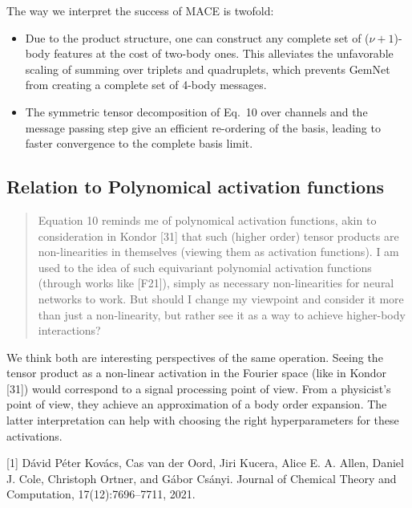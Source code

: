 \documentclass{article}
\begin{document}
The way we interpret the success of MACE is twofold:
\begin{itemize}
\item Due to the product structure, one can construct any complete set of ($\nu + 1$)-body features at the cost of two-body ones.
This alleviates the unfavorable scaling of summing over triplets and quadruplets, which prevents GemNet from creating a complete set of 4-body messages.
\item The symmetric tensor decomposition of Eq.~10 over channels and the message passing step give an efficient re-ordering of the basis, leading to faster convergence to the complete basis limit.
\end{itemize}

\subsection*{Relation to Polynomical activation functions}


\begin{quote}
    Equation 10 reminds me of polynomical activation functions, akin to consideration in Kondor [31] that such (higher order) tensor products are non-linearities in themselves (viewing them as activation functions). I am used to the idea of such equivariant polynomial activation functions (through works like [F21]), simply as necessary non-linearities for neural networks to work. But should I change my viewpoint and consider it more than just a non-linearity, but rather see it as a way to achieve higher-body interactions?
\end{quote}

We think both are interesting perspectives of the same operation.
Seeing the tensor product as a non-linear activation in the Fourier space (like in Kondor [31]) would correspond to a signal processing point of view.
From a physicist's point of view, they achieve an approximation of a body order expansion.
The latter interpretation can help with choosing the right hyperparameters for these activations.

[1] Dávid Péter Kovács, Cas van der Oord, Jiri Kucera, Alice E. A. Allen, Daniel J. Cole, Christoph Ortner, and Gábor Csányi. Journal of Chemical Theory and Computation, 17(12):7696–7711, 2021.
\end{document}
